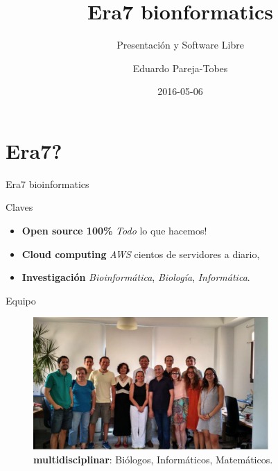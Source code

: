 \documentclass[12pt,compress]{beamer}
\title{Era7 bionformatics}
\subtitle{Presentación y Software Libre}
\author{Eduardo Pareja-Tobes}
\date{2016-05-06}
\institute{
  \href{http://era7bioinformatics.com}{{Era7} {\color{Grey-Light}bioinformatics}} - {\color{Salmon-Dark}oh}{\color{LightAmber-Dark}no}{\color{Grey}sequences}{\color{Salmon-Dark}!}
}
\let\OldHref\href
\renewcommand{\href}[2]{\OldHref[pdfnewwindow]{#1}{{\textbf{#2}}}}
\providecommand{\tightlist}{%
\setlength{\itemsep}{0pt}\setlength{\parskip}{0pt}}
\begin{document}
\maketitle


% 
\section{Era7?}\label{era7}

\begin{frame}{Era7 bioinformatics}


\begin{block}{Claves}

\begin{itemize}
\tightlist
\item
  \textbf{Open source 100\%} \emph{Todo} lo que hacemos!
\item
  \textbf{Cloud computing} \emph{AWS} cientos de servidores a diario,
\item
  \textbf{Investigación} \emph{Bioinformática}, \emph{Biología},
  \emph{Informática}.
\end{itemize}

\end{block}

\end{frame}

\begin{frame}{Equipo}

\begin{figure}[htbp]
\centering
\includegraphics[width=0.80000\textwidth]{images/equipo.jpg}
\caption{\textbf{multidisciplinar}: Biólogos, Informáticos,
Matemáticos.}
\end{figure}

\end{frame}
\end{document}
